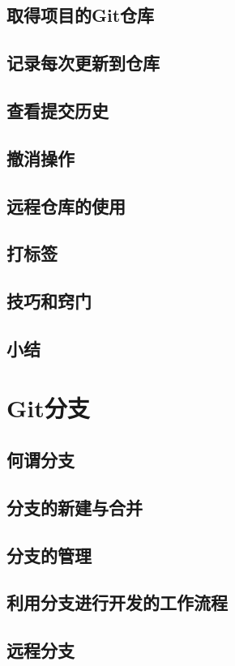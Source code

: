 \documentclass{book}
\begin{document}
	\section{取得项目的Git仓库}
	\section{记录每次更新到仓库}
	\section{查看提交历史}
	\section{撤消操作}
	\section{远程仓库的使用}
	\section{打标签}
	\section{技巧和窍门}
	\section{小结}

\chapter{Git分支}

	\section{何谓分支}
	\section{分支的新建与合并}
	\section{分支的管理}
	\section{利用分支进行开发的工作流程}
	\section{远程分支}
\end{document}
